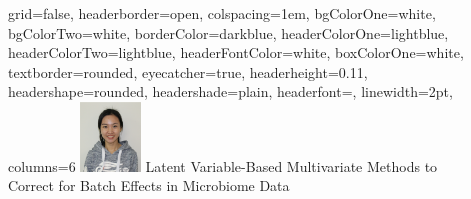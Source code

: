 \documentclass[a0paper,portrait]{baposter}
\begin{document}

\begin{poster}
{
grid=false,
headerborder=open, %
colspacing=1em, %
bgColorOne=white, %
bgColorTwo=white, %
borderColor=darkblue, %
headerColorOne=lightblue, %
headerColorTwo=lightblue, %
headerFontColor=white, %
boxColorOne=white, %
textborder=rounded, %
eyecatcher=true, %
headerheight=0.11\textheight, %
headershape=rounded, %
headershade=plain,
headerfont=\Large\textsf, %
linewidth=2pt, %
columns=6 
}
{\includegraphics[width=0.12\textwidth]{me.png}}
%
%
{
\textsf %
{\huge Latent Variable-Based Multivariate Methods to \\[0.1in]
Correct for Batch Effects in Microbiome Data
}
} %
{\sf\vspace{0.5em}
}
\end{poster}
\end{document}
